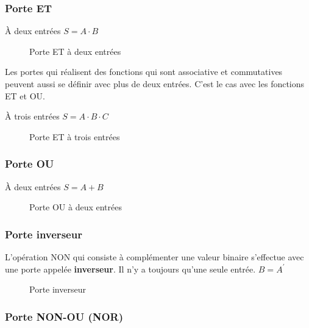 \documentclass[11pt]{article}
\begin{document}
\subsubsection{Porte ET}
\label{sec:org92ab1b3}

À deux entrées \(S =  A \cdot B\)

\begin{figure}[htbp]
\centering

\caption{\label{fig:orgb3593f4}Porte ET à deux entrées}
\end{figure}

Les portes qui réalisent des fonctions qui sont associative et
commutatives peuvent aussi se définir avec plus de deux entrées. C'est
le cas avec les fonctions ET et OU.

À trois entrées \(S =  A \cdot B \cdot C\)

\begin{figure}[htbp]
\centering

\caption{\label{fig:orgdc6c3c6}Porte ET à trois entrées}
\end{figure}

\subsubsection{Porte OU}
\label{sec:org5011933}

À deux entrées \(S =  A + B\)

\begin{figure}[htbp]
\centering

\caption{\label{fig:orgf282581}Porte OU à deux entrées}
\end{figure}

\subsubsection{Porte inverseur}
\label{sec:orgc883013}

L'opération NON qui consiste à complémenter une valeur binaire
s'effectue avec une porte appelée \textbf{inverseur}.  Il n'y a toujours
qu'une seule entrée. \(B = A^\prime\)

\begin{figure}[htbp]
\centering

\caption{\label{fig:org68493a6}Porte inverseur}
\end{figure} 

\subsubsection{Porte NON-OU (NOR)}
\label{sec:org20272fe}
\end{document}
